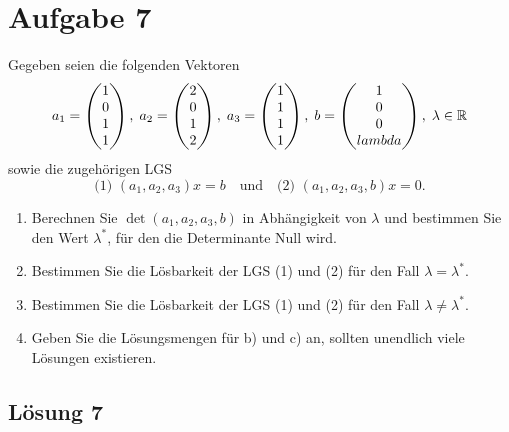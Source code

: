 \documentclass[main.tex]{subfiles}
\begin{document}
\section{Aufgabe 7}
Gegeben seien die folgenden Vektoren
$$
    a_1 = \vektor{1\\0\\1\\1}, \;
    a_2 = \vektor{2\\0\\1\\2}, \;
    a_3 = \vektor{1\\1\\1\\1}, \;
    b   = \vektor{1\\0\\0\\lambda}, \;
    \lambda \in \mathbb{R}
$$
sowie die zugehörigen LGS
$$
    \text{(1) } (a_1, a_2, a_3)x = b
    \quad \text{und} \quad
    \text{(2) } (a_1, a_2, a_3, b)x = 0.
$$
\begin{enumerate}
    \item Berechnen Sie $\det (a_1, a_2, a_3, b)$ in Abhängigkeit von $\lambda$ und bestimmen Sie den Wert $\lambda^*$, für den die Determinante Null wird.
    \item Bestimmen Sie die Lösbarkeit der LGS (1) und (2) für den Fall $\lambda = \lambda^*$.
    \item Bestimmen Sie die Lösbarkeit der LGS (1) und (2) für den Fall $\lambda \neq \lambda^*$.
    \item Geben Sie die Lösungsmengen für b) und c) an, sollten unendlich viele Lösungen existieren.
\end{enumerate}


\subsection{Lösung 7}
\end{document}
